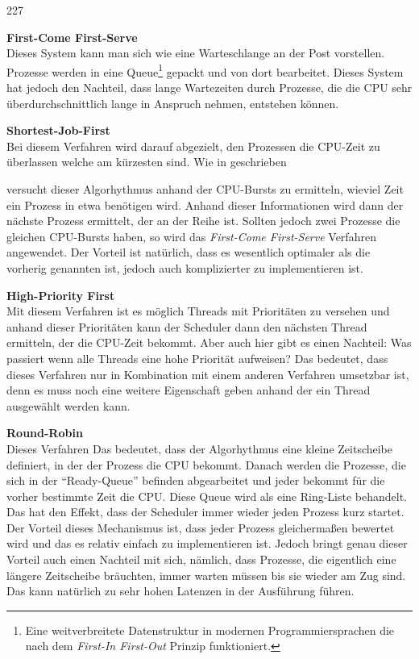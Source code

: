 \begin{dinglist}{227}
	\item{\textbf{First-Come First-Serve}} \\
	Dieses System kann man sich wie eine Warteschlange an der Post vorstellen. Prozesse werden in eine Queue\footnote{Eine weitverbreitete Datenstruktur in modernen Programmiersprachen die nach dem \textit{First-In First-Out} Prinzip funktioniert.} gepackt und von dort bearbeitet. Dieses System hat jedoch den Nachteil, dass lange Wartezeiten durch Prozesse, die die CPU sehr \"uberdurchschnittlich lange in Anspruch nehmen, entstehen k\"onnen.
	\item{\textbf{Shortest-Job-First}}\\
	Bei diesem Verfahren wird darauf abgezielt, den Prozessen die CPU-Zeit zu \"uberlassen welche am k\"urzesten sind. Wie in \cite[189]{scheduling} geschrieben
\begin{quote}
\end{quote}
versucht dieser Algorhythmus anhand der CPU-Bursts\parencite[vgl.][184]{scheduling} zu ermitteln, wieviel Zeit ein Prozess in etwa ben\"otigen wird. Anhand dieser Informationen wird dann der n\"achste Prozess ermittelt, der an der Reihe ist.
Sollten jedoch zwei Prozesse die gleichen CPU-Bursts haben, so wird das \textit{First-Come First-Serve} Verfahren angewendet. Der Vorteil ist nat\"urlich, dass es wesentlich optimaler als die vorherig genannten ist, jedoch auch komplizierter zu implementieren ist.
\item{\textbf{High-Priority First}}\\
Mit diesem Verfahren ist es m\"oglich Threads mit Priorit\"aten zu versehen und anhand dieser Priorit\"aten kann der Scheduler dann den n\"achsten Thread ermitteln, der die CPU-Zeit bekommt. Aber auch hier gibt es einen Nachteil: Was passiert wenn alle Threads eine hohe Priorit\"at aufweisen? Das bedeutet, dass dieses Verfahren nur in Kombination mit einem anderen Verfahren umsetzbar ist, denn es muss noch eine weitere Eigenschaft geben anhand der ein Thread ausgew\"ahlt werden kann.
	\item{\textbf{Round-Robin}}\\
	Dieses Verfahren 
		\parencite[vgl.][194]{scheduling}
Das bedeutet, dass der Algorhythmus eine kleine Zeitscheibe definiert, in der der Prozess die CPU bekommt. Danach werden die Prozesse, die sich in der ``Ready-Queue'' befinden abgearbeitet und jeder bekommt f\"ur die vorher bestimmte Zeit die CPU. Diese Queue wird als eine Ring-Liste behandelt. Das hat den Effekt, dass der Scheduler immer wieder jeden Prozess kurz startet. Der Vorteil dieses Mechanismus ist, dass jeder Prozess gleicherma\ss en bewertet wird und das es relativ einfach zu implementieren ist. Jedoch bringt genau dieser Vorteil auch einen Nachteil mit sich, n\"amlich, dass Prozesse, die eigentlich eine l\"angere Zeitscheibe br\"auchten, immer warten m\"ussen bis sie wieder am Zug sind. Das kann nat\"urlich zu sehr hohen Latenzen in der Ausf\"uhrung f\"uhren.
\end{dinglist}
